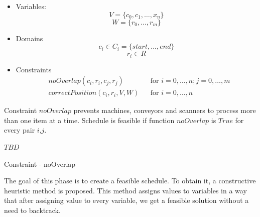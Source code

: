\documentclass{ctuthesis}
\begin{document}
\begin{itemize}
    \item Variables:\\
    \begin{equation}
        V = \{c_{0}, c_{1}, \ldots, x_{n}\}
    \end{equation}
    \begin{equation}
        W = \{r_0, \ldots, r_m\}
    \end{equation}
    \item Domains\\
    \begin{equation}
    c_{i} \in C_i = \{start, ..., end\}
    \end{equation}
    \begin{equation}
    r_{i} \in R
    \end{equation}
    \item Constraints
    \begin{equation}
    \begin{aligned}
    & noOverlap(c_i, r_i, c_j, r_j) &&\text{for } i=0,\ldots,n; j=0,\ldots,m\\
    & correctPosition(c_i, r_i, V, W) && \text{for } i=0,\ldots,n
    \end{aligned}
    \end{equation}
\end{itemize}

Constraint $noOverlap$ prevents machines, conveyors and scanners to process more than one item at a time. Schedule is feasible if function $noOverlap$ is $True$ for every pair $i$,$j$.
\label{overlap}
\begin{algorithm}
\SetAlgoLined
{}
$TBD$
 \caption{Constraint - noOverlap}
\end{algorithm}

The goal of this phase is to create a feasible schedule. To obtain it, a constructive heuristic method is proposed. This method assigns values to variables in a way that after assigning value to every variable, we get a feasible solution without a need to backtrack.
\end{document}

